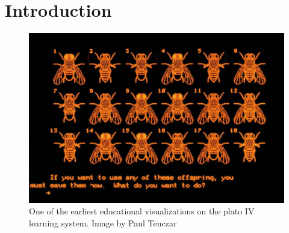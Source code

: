 %





\chapter{Introduction}
\label{sec:intro}

\begin{figure}[b!]
	\centering
	\includegraphics[width=\linewidth]{pictures/plato.png}
	\captionsetup{labelfont=bf,textfont=it}
	\caption[Educational visualizations on the \acrshort{plato} system. Taken from \cite{lapsley2017review}]{One of the earliest educational visualizations on the \acrshort{plato} IV learning system. Image by Paul Tenczar \cite{lapsley2017review} \label{fig:plato}}
\end{figure}

